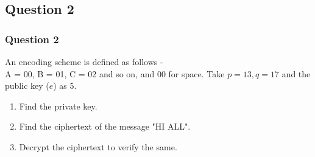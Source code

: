 \documentclass[xcolor=svgnames]{beamer}
\begin{document}
\subsection{Question 2}
\begin{frame}
\frametitle{Question 2}
An encoding scheme is defined as follows - 
\\ A = 00, B = 01, C = 02 and so on, and 00 for space. Take $p = 13, q = 17$ and the public key ($e$) as 5.
\begin{enumerate}
    \item Find the private key.
    \item Find the ciphertext of the message "HI ALL".
    \item Decrypt the ciphertext to verify the same.
\end{enumerate}

\end{frame}


\end{document}
